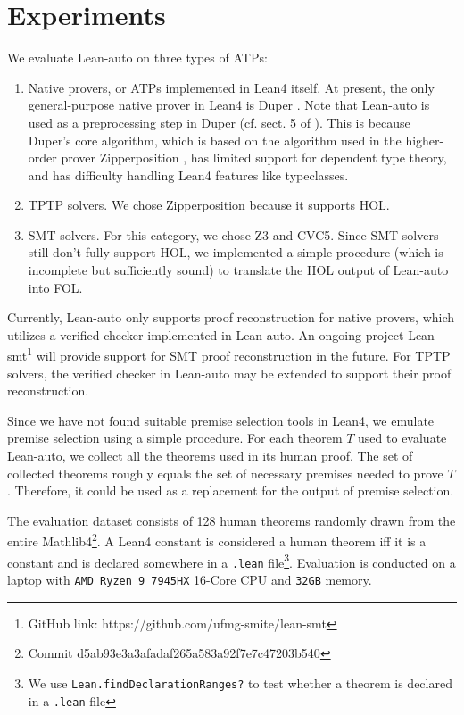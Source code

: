 \section{Experiments}\label{sectexpr}

  We evaluate Lean-auto on three types of ATPs:
  \begin{enumerate}
    \item Native provers, or ATPs implemented in Lean4 itself. At present, the only general-purpose
      native prover in Lean4 is Duper \cite{DuperPaper}. Note that Lean-auto is
      used as a preprocessing step in Duper (cf. sect. 5 of \cite{DuperPaper}).
      This is because Duper's core algorithm, which is based on the algorithm used
      in the higher-order prover Zipperposition \cite{ZipperpositionMakeWork}, has limited support for dependent
      type theory, and has difficulty handling Lean4 features like typeclasses.
    \item TPTP solvers. We chose Zipperposition because it supports HOL.
    \item SMT solvers. For this category, we chose Z3 and CVC5. Since SMT solvers
      still don't fully support HOL, we implemented a simple procedure
      (which is incomplete but sufficiently sound) to translate the HOL output of Lean-auto into FOL.
  \end{enumerate}

  Currently, Lean-auto only supports proof reconstruction for native provers,
  which utilizes a verified checker implemented in Lean-auto. An
  ongoing project Lean-smt\footnote{GitHub link: https://github.com/ufmg-smite/lean-smt}
  will provide support for SMT proof reconstruction in the future. For TPTP solvers,
  the verified checker in Lean-auto may be extended to support their proof reconstruction.

  Since we have not found suitable premise selection tools in Lean4, we emulate
  premise selection using a simple procedure. For each theorem $T$ used to evaluate
  Lean-auto, we collect all the theorems used in its human proof. The set of collected theorems
  roughly equals the set of necessary premises needed to prove $T$. Therefore, it could
  be used as a replacement for the output of premise selection.

  The evaluation dataset consists of 128 human theorems randomly drawn from the entire
  Mathlib4\footnote{Commit d5ab93e3a3afadaf265a583a92f7e7c47203b540}. A
  Lean4 constant is considered a human theorem iff it is a constant and
  is declared somewhere in a \texttt{.lean} file\footnote{We use
  \texttt{Lean.findDeclarationRanges?} to test whether a theorem is
  declared in a \texttt{.lean} file}. Evaluation is conducted on a laptop
  with \texttt{AMD Ryzen 9 7945HX} 16-Core CPU and \texttt{32GB} memory.